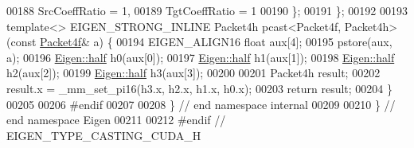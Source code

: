 \begin{DoxyCode}
00188     SrcCoeffRatio = 1,
00189     TgtCoeffRatio = 1
00190   \};
00191 \};
00192 
00193 \textcolor{keyword}{template}<> EIGEN\_STRONG\_INLINE Packet4h pcast<Packet4f, Packet4h>(\textcolor{keyword}{const} \hyperlink{struct_eigen_1_1internal_1_1_packet4f}{Packet4f}& a) \{
00194   EIGEN\_ALIGN16 \textcolor{keywordtype}{float} aux[4];
00195   pstore(aux, a);
00196   \hyperlink{struct_eigen_1_1half}{Eigen::half} h0(aux[0]);
00197   \hyperlink{struct_eigen_1_1half}{Eigen::half} h1(aux[1]);
00198   \hyperlink{struct_eigen_1_1half}{Eigen::half} h2(aux[2]);
00199   \hyperlink{struct_eigen_1_1half}{Eigen::half} h3(aux[3]);
00200 
00201   Packet4h result;
00202   result.x = \_mm\_set\_pi16(h3.x, h2.x, h1.x, h0.x);
00203   \textcolor{keywordflow}{return} result;
00204 \}
00205 
00206 \textcolor{preprocessor}{#endif}
00207 
00208 \} \textcolor{comment}{// end namespace internal}
00209 
00210 \} \textcolor{comment}{// end namespace Eigen}
00211 
00212 \textcolor{preprocessor}{#endif // EIGEN\_TYPE\_CASTING\_CUDA\_H}
\end{DoxyCode}
